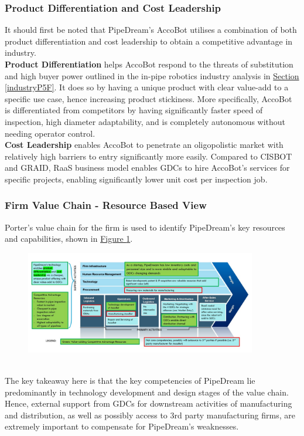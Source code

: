 \documentclass[11pt]{article}		%
\newcommand{\figref}[1]{\hyperref[#1]{Figure \ref*{#1}}}    %
\newcommand{\sectref}[1]{\hyperref[#1]{Section \ref*{#1}}}     %
\begin{document}
	\subsubsection{Product Differentiation and Cost Leadership}\label{strategy}
	
	It should first be noted that PipeDream's AccoBot utilises a combination of both product differentiation and cost leadership to obtain a competitive advantage in industry.
	\\ 
	\hspace*{2ex}\textbf{Product Differentiation} helps AccoBot respond to the threats of substitution and high buyer power outlined in the in-pipe robotics industry analysis in \sectref{industryP5F}. It does so by having a unique product with clear value-add to a specific use case, hence increasing product stickiness. More specifically, AccoBot is differentiated from competitors by having significantly faster speed of inspection, high diameter adaptability, and is completely autonomous without needing operator control.
	\\ 
	\hspace*{2ex}\textbf{Cost Leadership} enables AccoBot to penetrate an oligopolistic market with relatively high barriers to entry significantly more easily. Compared to CISBOT and GRAID, RaaS business model enables GDCs to hire AccoBot's services for specific projects, enabling significantly lower unit cost per inspection job. 
	
	\subsubsection[Firm Value Chain]{Firm Value Chain - Resource Based View}\label{valueChainanal}
	
        Porter's value chain for the firm is used to identify PipeDream's key resources and capabilities, shown in \figref{valueChain}. 
        \begin{figure}[h]
    		\centering
			\includegraphics[width=0.9\textwidth]{valuechain.jpg}
			\label{valueChain}
        \end{figure}
        \\ 
	    \hspace*{2ex} The key takeaway here is that the key competencies of PipeDream lie predominantly in technology development and design stages of the value chain. Hence, external support from GDCs for downstream activities of manufacturing and distribution, as well as possibly access to 3rd party manufacturing firms, are extremely important to compensate for PipeDream's weaknesses. 
\end{document}

